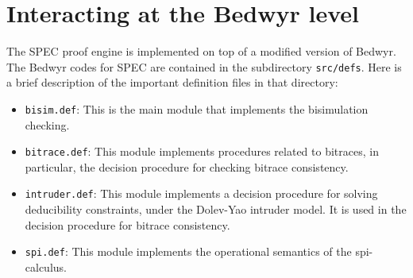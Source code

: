 \documentclass{article}
\begin{document}
\section{Interacting at the Bedwyr level}
\label{sec:bedwyr}


The SPEC proof engine is implemented on top of a modified version of Bedwyr. 
The Bedwyr codes for SPEC are contained in the subdirectory \texttt{src/defs}. 
Here is a brief description of the important definition files in that directory:
\begin{itemize}
\item \texttt{bisim.def}: This is the main module that implements the bisimulation checking.
\item \texttt{bitrace.def}: This module implements procedures related to bitraces, in particular,
the decision procedure for checking bitrace consistency.

\item \texttt{intruder.def}: This module implements a decision procedure for solving
deducibility constraints, under the Dolev-Yao intruder model. 
It is used in the decision procedure for bitrace consistency.

\item \texttt{spi.def}: This module implements the operational semantics of the spi-calculus.

\end{itemize}
\end{document}
